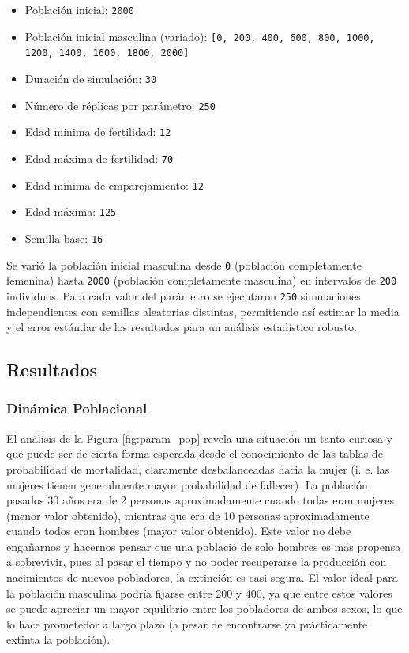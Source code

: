 \documentclass[12pt, a4paper, spanish]{report}
\begin{document}
\begin{itemize}
	\item Población inicial: \texttt{2000}
	\item Población inicial masculina (variado): \texttt{[0, 200, 400, 600, 800, 1000, 1200, 1400, 1600, 1800, 2000]}
	\item Duración de simulación: \texttt{30}
	\item Número de réplicas por parámetro: \texttt{250}
	\item Edad mínima de fertilidad: \texttt{12}
	\item Edad máxima de fertilidad: \texttt{70}
	\item Edad mínima de emparejamiento: \texttt{12}
	\item Edad máxima: \texttt{125}
	\item Semilla base: \texttt{16}
\end{itemize}

Se varió la población inicial masculina desde \texttt{0} (población completamente femenina) hasta \texttt{2000} (población completamente masculina) en intervalos de \texttt{200} individuos. Para cada valor del parámetro se ejecutaron \texttt{250} simulaciones independientes con semillas aleatorias distintas, permitiendo así estimar la media y el error estándar de los resultados para un análisis estadístico robusto.

\subsection{Resultados}

\subsubsection{Dinámica Poblacional}

 El análisis de la Figura \ref{fig:param_pop} revela una situación un tanto curiosa y que puede ser de cierta forma esperada desde el conocimiento de las tablas de probabilidad de mortalidad, claramente desbalanceadas hacia la mujer (i. e. las mujeres tienen generalmente mayor probabilidad de fallecer). La población pasados 30 años era de 2 personas aproximadamente cuando todas eran mujeres (menor valor obtenido), mientras que era de 10 personas aproximadamente cuando todos eran hombres (mayor valor obtenido). Este valor no debe engañarnos y hacernos pensar que una població de solo hombres es más propensa a sobrevivir, pues al pasar el tiempo y no poder recuperarse la producción con nacimientos de nuevos pobladores, la extinción es casi segura. El valor ideal para la población masculina podría fijarse entre 200 y 400, ya que entre estos valores se puede apreciar un mayor equilibrio entre los pobladores de ambos sexos, lo que lo hace prometedor a largo plazo (a pesar de encontrarse ya prácticamente extinta la población).
\end{document}
